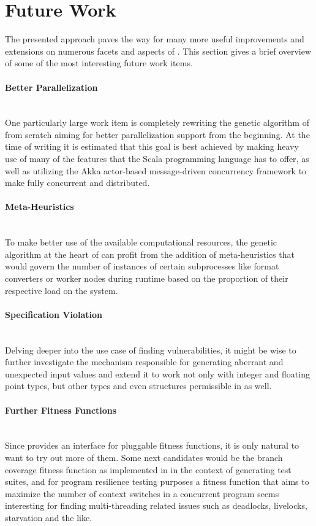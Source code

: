 \section{Future Work}
\label{sec:future}
The presented approach paves the way for many more useful improvements and extensions on numerous facets and
aspects of \xmlmate. This section gives a brief overview of some of the most interesting future work items.

\paragraph{Better Parallelization} ~\\
One particularly large work item is completely rewriting the
genetic algorithm of \xmlmate from scratch aiming for better parallelization support from the beginning. At the time of writing it is estimated that this
goal is best achieved by making heavy use of many of the features that the {\small
Scala}\cite{scala-overview-tech-report} programming language has to offer, as well as utilizing the {\small
Akka} actor-based message-driven concurrency framework\cite{Wyatt:2013:AC:2663429} to make \xmlmate fully
concurrent and distributed.
\paragraph{Meta-Heuristics} ~\\
To make better use of the available computational resources, the genetic algorithm at the heart of
\xmlmate can profit from the addition of meta-heuristics that would govern the number of instances of certain
subprocesses like format converters or worker nodes during runtime based on the proportion of their
respective load on the system.
\paragraph{Specification Violation} ~\\
Delving deeper into the use case of finding vulnerabilities, it might be wise to further investigate
the mechanism responsible for generating aberrant and unexpected input values and extend it to work not only
with integer and floating point types, but other types and even structures permissible in \xml as well.
\paragraph{Further Fitness Functions} ~\\
Since \xmlmate provides an interface for pluggable fitness functions, it is only natural to want to try
out more of them. Some next candidates would be the branch coverage fitness function as implemented in
\evosuite in the context of generating test suites, and for program resilience testing purposes a fitness
function that aims to maximize the number of context switches in a concurrent program seems interesting for
finding multi-threading related issues such as deadlocks, livelocks, starvation and the like.
